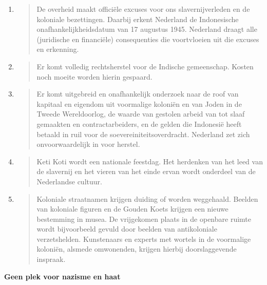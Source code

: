\begin{enumerate}
\def\labelenumi{\arabic{enumi}.}
\item
  \begin{quote}
  De overheid maakt officiële excuses voor ons slavernijverleden en de
  koloniale bezettingen. Daarbij erkent Nederland de Indonesische
  onafhankelijkheidsdatum van 17 augustus 1945. Nederland draagt alle
  (juridische en financiële) consequenties die voortvloeien uit die
  excuses en erkenning.
  \end{quote}
\item
  \begin{quote}
  Er komt volledig rechtsherstel voor de Indische gemeenschap. Kosten
  noch moeite worden hierin gespaard.
  \end{quote}
\item
  \begin{quote}
  Er komt uitgebreid en onafhankelijk onderzoek naar de roof van
  kapitaal en eigendom uit voormalige koloniën en van Joden in de Tweede
  Wereldoorlog, de waarde van gestolen arbeid van tot slaaf gemaakten en
  contractarbeiders, en de gelden die Indonesië heeft betaald in ruil
  voor de soevereiniteitsoverdracht. Nederland zet zich onvoorwaardelijk
  in voor herstel.
  \end{quote}
\item
  \begin{quote}
  Keti Koti wordt een nationale feestdag. Het herdenken van het leed van
  de slavernij en het vieren van het einde ervan wordt onderdeel van de
  Nederlandse cultuur.
  \end{quote}
\item
  \begin{quote}
  Koloniale straatnamen krijgen duiding of worden weggehaald. Beelden
  van koloniale figuren en de Gouden Koets krijgen een nieuwe bestemming
  in musea. De vrijgekomen plaats in de openbare ruimte wordt
  bijvoorbeeld gevuld door beelden van antikoloniale verzetshelden.
  Kunstenaars en experts met wortels in de voormalige koloniën, alsmede
  omwonenden, krijgen hierbij doorslaggevende inspraak.
  \end{quote}
\end{enumerate}

\textbf{Geen plek voor nazisme en haat}

